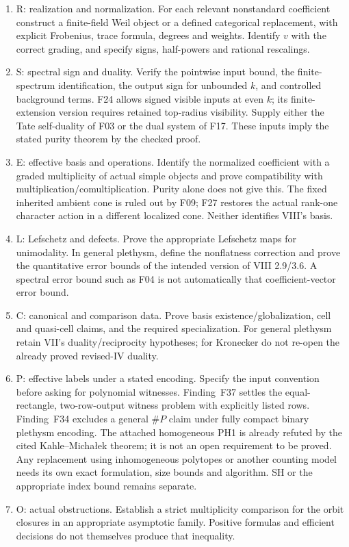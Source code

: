 \documentclass[11pt,a4paper]{article}
\newcommand{\fid}[1]{\textsf{#1}}\newcommand{\gate}[1]{\textsf{#1}}
\theoremstyle{named}\newtheorem{finding}{Finding}[section]
\theoremstyle{definition}\newtheorem{definition}[finding]{Definition}
\theoremstyle{remark}\newtheorem{remark}[finding]{Remark}
\begin{document}
\begin{enumerate}
\item \gate{R: realization and normalization.} For each relevant nonstandard coefficient construct a finite-field Weil object or a defined categorical replacement, with explicit Frobenius, trace formula, degrees and weights. Identify $v$ with the correct grading, and specify signs, half-powers and rational rescalings.
\item \gate{S: spectral sign and duality.} Verify the pointwise input bound, the finite-spectrum identification, the output sign for unbounded $k$, and controlled background terms. F24 allows signed visible inputs at even $k$; its finite-extension version requires retained top-radius visibility. Supply either the Tate self-duality of \fid{F03} or the dual system of \fid{F17}. These inputs imply the stated purity theorem by the checked proof.
\item \gate{E: effective basis and operations.} Identify the normalized coefficient with a graded multiplicity of actual simple objects and prove compatibility with multiplication/comultiplication. Purity alone does not give this. The fixed inherited ambient cone is ruled out by \fid{F09}; F27 restores the actual rank-one character action in a different localized cone. Neither identifies VIII's basis.
\item \gate{L: Lefschetz and defects.} Prove the appropriate Lefschetz maps for unimodality. In general plethysm, define the nonflatness correction and prove the quantitative error bounds of the intended version of VIII 2.9/3.6. A spectral error bound such as \fid{F04} is not automatically that coefficient-vector error bound.
\item \gate{C: canonical and comparison data.} Prove basis existence/globalization, cell and quasi-cell claims, and the required specialization. For general plethysm retain VII's duality/reciprocity hypotheses; for Kronecker do not re-open the already proved revised-IV duality.
\item \gate{P: effective labels under a stated encoding.} Specify the input convention before asking for polynomial witnesses. Finding~\fid{F37} settles the equal-rectangle, two-row-output witness problem with explicitly listed rows. Finding~\fid{F34} excludes a general \(\#P\) claim under fully compact binary plethysm encoding. The attached homogeneous PH1 is already refuted by the cited Kahle--Micha{\l}ek theorem; it is not an open requirement to be proved. Any replacement using inhomogeneous polytopes or another counting model needs its own exact formulation, size bounds and algorithm. SH or the appropriate index bound remains separate.
\item \gate{O: actual obstructions.} Establish a strict multiplicity comparison for the orbit closures in an appropriate asymptotic family. Positive formulas and efficient decisions do not themselves produce that inequality.
\end{enumerate}
\end{document}
